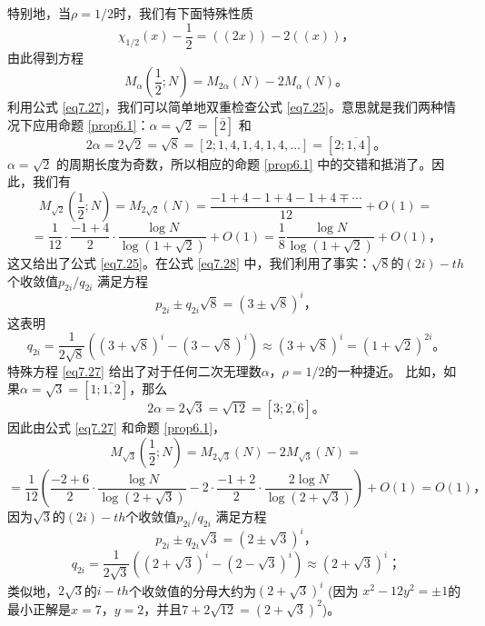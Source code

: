 \documentclass[11pt,a4paper]{article}
\theoremstyle{definition}
\newcommand{\refeq}[1]{公式 \ref{#1}}
\newcommand{\refprop}[1]{命题 \ref{#1}}
\numberwithin{equation}{section}
\newcommand{\comma}{\text{，}}
\newcommand{\juhao}{\text{。}}
\newcommand{\fenhao}{\text{；}}
\newcommand{\pelleq}[2]{ $ x^{2}-#1y^{2}=#2 $} %
\newcommand{\erfenzy}{\dfrac{1}{2}}
\newcommand{\ddbrace}[1]{\left(\left(#1\right)\right)}
\begin{document}
特别地，当$ \rho=1/2 $时，我们有下面特殊性质
\begin{equation}\label{eq7.26}
\chi_{1/2}(x)-\erfenzy=\ddbrace{2x}-2\ddbrace{x}\comma
\end{equation}
由此得到方程
\begin{equation}\label{eq7.27}
M_{\alpha}\left(\erfenzy;N\right)=M_{2\alpha}\left(N\right)-2M_{\alpha}\left(N\right)\juhao
\end{equation}
利用\refeq{eq7.27}，我们可以简单地双重检查\refeq{eq7.25}。意思就是我们两种情况下应用\refprop{prop6.1}：$ \alpha=\sqrt{2}=\left[\overline{2}\right] $ 和
\[ 2\alpha=2\sqrt{2}=\sqrt{8}=\left[2;1,4,1,4,1,4,\ldots\right]=\left[2;\overline{1,4}\right]\juhao \]
$ \alpha=\sqrt{2} $ 的周期长度为奇数，所以相应的\refprop{prop6.1} 中的交错和抵消了。因此，我们有
\[ M_{\sqrt{2}}\left(\erfenzy;N\right)=M_{2\sqrt{2}}\left(N\right)=\dfrac{-1+4-1+4-1+4\mp\cdots}{12}+O(1)= \]
\begin{equation}\label{eq7.28}
=\dfrac{1}{12}\cdot\dfrac{-1+4}{2}\cdot\dfrac{\log N}{\log\left(1+\sqrt{2}\right)}+O(1)=\dfrac{1}{8}\dfrac{\log N}{\log\left(1+\sqrt{2}\right)}+O(1)\comma
\end{equation}
这又给出了\refeq{eq7.25}。在\refeq{eq7.28} 中，我们利用了事实：$ \sqrt{8} $的$ (2i)-th $个收敛值$ p_{2i}/q_{2i} $ 满足方程
\[ p_{2i}\pm q_{2i}\sqrt{8}=\left(3\pm\sqrt{8}\right)^{i}\comma \]
这表明
\[ q_{2i}=\dfrac{1}{2\sqrt{8}}\left(\left(3+\sqrt{8}\right)^{i}-\left(3-\sqrt{8}\right)^{i}\right)\approx\left(3+\sqrt{8}\right)^{i}=\left(1+\sqrt{2}\right)^{2i}\juhao \]
特殊方程 \ref{eq7.27} 给出了对于任何二次无理数$ \alpha $，$ \rho=1/2 $的一种捷近。
比如，如果$ \alpha =\sqrt{3}=\left[1;\overline{1,2}\right] $，那么
\[ 2\alpha=2\sqrt{3}=\sqrt{12}=\left[3;\overline{2,6}\right] \juhao\]
因此由\refeq{eq7.27} 和\refprop{prop6.1}，
\[ M_{\sqrt{3}}\left(\erfenzy;N\right)=M_{2\sqrt{3}}\left(N\right)-2M_{\sqrt{3}}\left(N\right)= \]
\begin{equation}\label{eq7.29}
=\dfrac{1}{12}\left(\dfrac{-2+6}{2}\cdot\dfrac{\log N}{\log\left(2+\sqrt{3}\right)}-2\cdot\dfrac{-1+2}{2}\cdot\dfrac{2\log N}{\log\left(2+\sqrt{3}\right)}\right)+O(1)=O(1)\comma
\end{equation}
因为$ \sqrt{3} $的$ (2i)-th $个收敛值$ p_{2i}/q_{2i} $ 满足方程
\[ p_{2i}\pm q_{2i}\sqrt{3}=\left(2\pm\sqrt{3}\right)^{i}\comma \]
\[ q_{2i}=\dfrac{1}{2\sqrt{3}}\left(\left(2+\sqrt{3}\right)^{i}-\left(2-\sqrt{3}\right)^{i}\right)\approx\left(2+\sqrt{3}\right)^{i}\fenhao \]
类似地，$ 2\sqrt{3} $的$i-th $个收敛值的分母大约为$ \left(2+\sqrt{3}\right)^{i} $ (因为\pelleq{12}{\pm1}的最小正解是$ x=7\comma y=2 $，并且$ 7+2\sqrt{12}=\left(2+\sqrt{3}\right)^{2} $)。
\end{document}
